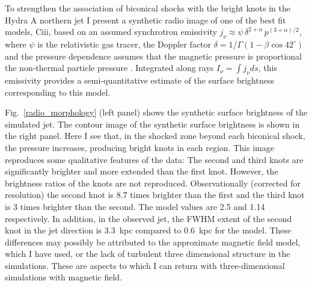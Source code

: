 To strengthen the association of biconical shocks with the bright knots in the Hydra A northern jet I present a synthetic radio image of one of the best fit models, Ciii, based on an assumed synchrotron emissivity $j_{\nu} \approx {\psi} \, \delta^{2+\alpha} \, p^{(3+\alpha)/2}$, where $\psi$ is the relativistic gas tracer, the Doppler factor $\delta= 1/\Gamma(1-\beta \cos 42^\circ)$ and the pressure dependence assumes that the magnetic pressure is proportional the non-thermal particle pressure \citep[see][\ \S 5.4]{sutherland07a}. Integrated along rays
$I_\nu = \int j_\nu ds$,
 this emissivity provides a semi-quantitative estimate of the surface brightness corresponding to this model.

Fig.~\ref{radio_morphology} (left panel) shows the synthetic surface brightness of the simulated jet. The contour image of the synthetic surface brightness is shown in the right panel. Here I see that, in the shocked zone beyond each biconical shock,  the pressure increases, producing bright knots in each region. This image reproduces some qualitative features of the data: The second and third knots are significantly brighter and more extended than the first knot. However, the 
brightness ratios of the knots are not reproduced. 
Observationally (corrected for resolution) the second knot is 8.7 times brighter than the first and the third knot is 3 times brighter than the second. The model values are 2.5 and 1.14 respectively. In addition, in the observed jet, the FWHM extent of the second knot in the jet direction is 3.3~kpc compared to 0.6~kpc for the model. These differences may possibly be attributed to the approximate magnetic field model, which I have used, or the lack of turbulent three dimensional structure in the simulations. These are aspects to which I can return with three-dimensional simulations with magnetic field. 

%
%
